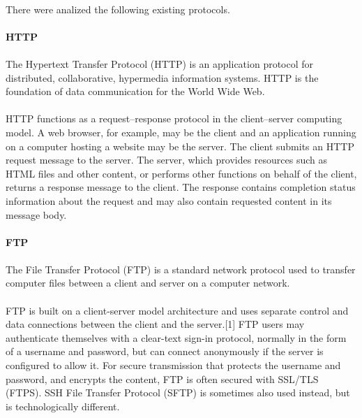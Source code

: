 \paragraph{}
There were analized the following existing protocols.

\paragraph{} \textbf{HTTP}
\paragraph{}
The Hypertext Transfer Protocol (HTTP) is an application protocol for distributed, collaborative, hypermedia information systems. HTTP is the foundation of data communication for the World Wide Web.
\paragraph{}
HTTP functions as a request–response protocol in the client–server computing model. A web browser, for example, may be the client and an application running on a computer hosting a website may be the server. The client submits an HTTP request message to the server. The server, which provides resources such as HTML files and other content, or performs other functions on behalf of the client, returns a response message to the client. The response contains completion status information about the request and may also contain requested content in its message body.

\paragraph{} \textbf{FTP}
\paragraph{}
The File Transfer Protocol (FTP) is a standard network protocol used to transfer computer files between a client and server on a computer network.
\paragraph{}
FTP is built on a client-server model architecture and uses separate control and data connections between the client and the server.[1] FTP users may authenticate themselves with a clear-text sign-in protocol, normally in the form of a username and password, but can connect anonymously if the server is configured to allow it. For secure transmission that protects the username and password, and encrypts the content, FTP is often secured with SSL/TLS (FTPS). SSH File Transfer Protocol (SFTP) is sometimes also used instead, but is technologically different.
